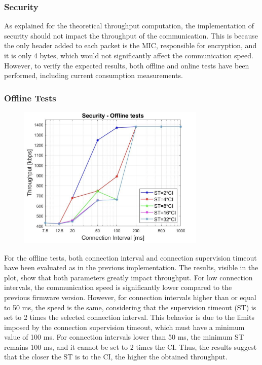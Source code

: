 \documentclass{Configuration_Files/PoliMi3i_thesis}
\begin{document}
\subsubsection*{Security}

As explained for the theoretical throughput computation, the implementation of security should not impact the throughput of the communication. This is because the only header added to each packet is the MIC, responsible for encryption, and it is only 4 bytes, which would not significantly affect the communication speed. However, to verify the expected results, both offline and online tests have been performed, including current consumption measurements.

\subsubsection*{Offline Tests}

\begin{figure}[h!]
    \centering
    \includegraphics[width=0.8\textwidth]{Results Manuel/figure9}
    \label{fig:figure1}
\end{figure}

For the offline tests, both connection interval and connection supervision timeout have been evaluated as in the previous implementation. The results, visible in the plot, show that both parameters greatly impact throughput. For low connection intervals, the communication speed is significantly lower compared to the previous firmware version. However, for connection intervals higher than or equal to 50 ms, the speed is the same, considering that the supervision timeout (ST) is set to 2 times the selected connection interval. This behavior is due to the limits imposed by the connection supervision timeout, which must have a minimum value of 100 ms. For connection intervals lower than 50 ms, the minimum ST remains 100 ms, and it cannot be set to 2 times the CI. Thus, the results suggest that the closer the ST is to the CI, the higher the obtained throughput.
\end{document}

